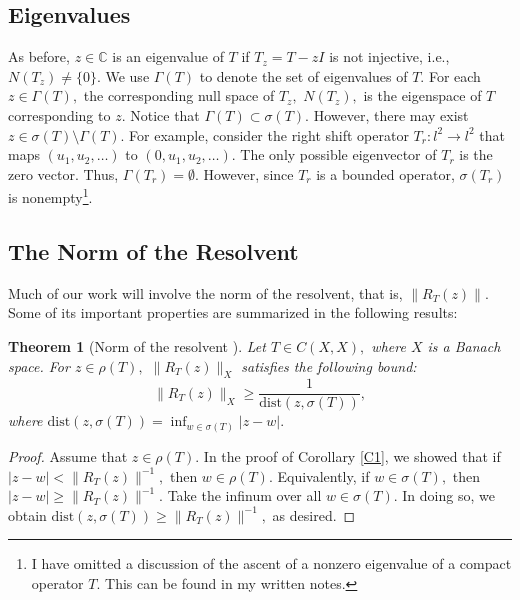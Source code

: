 \documentclass[12pt,a4paper]{article}
\theoremstyle{boldthm}
\newtheorem{theorem}{Theorem}[section]
\theoremstyle{bolddefn}
\begin{document}
\subsection{Eigenvalues}

As before, $z \in \mathbb{C}$ is an eigenvalue of $T$ if $T_z = T - zI$ is not injective, i.e., $N(T_z) \ne \{0\}.$ We use $\Gamma(T)$ to denote the set of eigenvalues of $T.$ For each $z \in \Gamma(T),$ the corresponding null space of $T_z,$ $N(T_z),$ is the eigenspace of $T$ corresponding to $z.$ Notice that $\Gamma(T)\subset \sigma(T).$ However, there may exist $z \in \sigma(T) \setminus \Gamma(T).$ For example, consider the right shift operator $T_r : l^2 \rightarrow l^2$ that maps $(u_1, u_2, \dots)$ to $(0, u_1, u_2, \dots).$ The only possible eigenvector of $T_r$ is the zero vector. Thus, $\Gamma(T_r) = \emptyset.$ However, since $T_r$ is a bounded operator, $\sigma(T_r)$ is nonempty\footnote{I have omitted a discussion of the ascent of a nonzero eigenvalue of a compact operator $T.$ This can be found in my written notes.}.

\subsection{The Norm of the Resolvent}

Much of our work will involve the norm of the resolvent, that is, $\| R_T(z) \|.$ Some of its important properties are summarized in the following results:

\begin{theorem}[Norm of the resolvent \cite{Nick}]  Let $T \in C(X, X),$ where $X$ is a Banach space. For $z \in \rho(T),$ $\| R_T(z) \|_X$ satisfies the following bound:
    \begin{equation}
        \| R_T(z) \|_X \ge \frac{1}{\text{dist}(z, \sigma(T))},
    \end{equation}
    where $\text{dist}(z, \sigma(T)) = \inf_{w \in \sigma(T)} | z - w |.$
\end{theorem}

\begin{proof}
    Assume that $z \in \rho(T).$ In the proof of Corollary \ref{C1}, we showed that if $|z - w|< \|R_T(z)\|^{-1},$ then $w\in \rho(T).$ Equivalently, if $w \in \sigma(T),$ then $|z - w| \ge \| R_T(z) \|^{-1}.$ Take the infinum over all $w \in \sigma(T).$ In doing so, we obtain $\text{dist}(z, \sigma(T)) \ge \| R_T(z) \|^{-1},$ as desired.
\end{proof}
\end{document}
